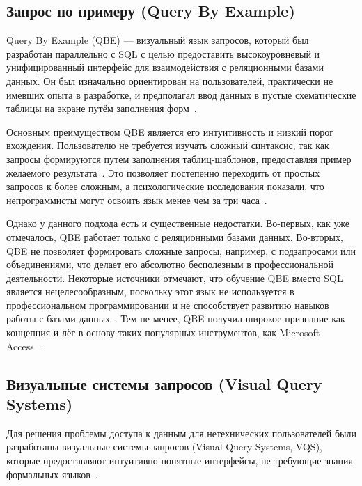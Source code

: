 \subsection{Запрос по примеру (Query By Example)}

Query By Example (QBE) --- визуальный язык запросов, который был разработан параллельно с SQL с целью
предоставить высокоуровневый и унифицированный интерфейс для взаимодействия с реляционными
базами данных. Он был изначально ориентирован на пользователей,
практически не имевших опыта в разработке, и предполагал ввод данных в пустые
схематические таблицы на экране путём заполнения
форм~\cite{maranAlternativeApproachesData2020, zloofQuerybyexampleDataBase1977}.

Основным преимуществом QBE является его интуитивность и низкий порог вхождения.
Пользователю не требуется изучать сложный синтаксис,
так как запросы формируются путем заполнения таблиц-шаблонов,
предоставляя пример желаемого результата~\cite{catarciVisualQuerySystems1997,zloofQuerybyexampleDataBase1977}.
Это позволяет постепенно переходить от простых запросов к более сложным,
а психологические исследования показали, что непрограммисты могут освоить язык менее
чем за три часа~\cite{zloofQuerybyexampleDataBase1977}.

Однако у данного подхода есть и существенные недостатки.
Во-первых, как уже отмечалось, QBE работает только с реляционными базами данных.
Во-вторых, QBE не позволяет формировать сложные запросы, например, с подзапросами или объединениями,
что делает его абсолютно бесполезным в профессиональной деятельности.
Некоторые источники отмечают, что обучение QBE вместо SQL является нецелесообразным,
поскольку этот язык не используется в профессиональном программировании и
не способствует развитию навыков работы с
базами данных~\cite{pirogovNekotoryeOsobennostiPrepodavaniya2018}.
Тем не менее, QBE получил широкое признание как концепция и лёг в основу таких
популярных инструментов, как Microsoft Access~\cite{maranAlternativeApproachesData2020}.




\subsection{Визуальные системы запросов (Visual Query Systems)}

Для решения проблемы доступа
к данным для нетехнических пользователей были разработаны визуальные
системы запросов (Visual Query Systems, VQS), которые предоставляют интуитивно понятные интерфейсы,
не требующие знания формальных языков~\cite{catarciVisualQuerySystems1996,
	catarciVisualQuerySystems1997, baskaranSyntaticSemanticVisual2013}.

